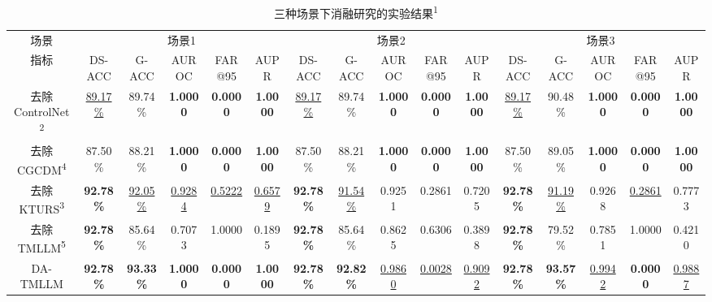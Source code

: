 \documentclass[UTF8,lettersize,journal]{IEEEtran}
\begin{document}
\setlength{\tabcolsep}{1pt}
\begin{table}[t!]
	\footnotesize
	\caption{三种场景下消融研究的实验结果\textsuperscript{1}}
	\renewcommand{\arraystretch}{1.5}
	\centering
	\label{tab:ablation_study}       %
	\begin{tabular}{c|ccccc|ccccc|ccccc}
		\toprule[1pt]\noalign{\vspace{0.5pt}}
		场景&\multicolumn{5}{c|}{场景1}&\multicolumn{5}{c|}{场景2}&\multicolumn{5}{c}{场景3}
		\\\cmidrule(lr){2-6}\cmidrule(lr){7-11}\cmidrule(lr){12-16}
		指标&DS-ACC &G-ACC &AUROC &FAR@95 &AUPR &DS-ACC &G-ACC &AUROC &FAR@95 &AUPR &DS-ACC &G-ACC &AUROC &FAR@95 &AUPR \\\midrule[1pt] 
		去除ControlNet\textsuperscript{2}
		& \underline{89.17\%} & 89.74\% & \textbf{1.0000} & \textbf{0.0000} & \textbf{1.0000} & \underline{89.17\%} & 89.74\% & \textbf{1.0000} & \textbf{0.0000} & \textbf{1.0000} & \underline{89.17\%} & 90.48\% & \textbf{1.0000} & \textbf{0.0000} & \textbf{1.0000} \\
		\noalign{\vspace{2.8pt}}\hline\noalign{\smallskip}
		去除CGCDM\textsuperscript{4}
		& 87.50\% & 88.21\% & \textbf{1.0000} & \textbf{0.0000} & \textbf{1.0000} & 87.50\% & 88.21\% & \textbf{1.0000} & \textbf{0.0000} & \textbf{1.0000} & 87.50\% & 89.05\% & \textbf{1.0000} & \textbf{0.0000} & \textbf{1.0000} \\
		\noalign{\vspace{2.8pt}}\hline\noalign{\smallskip}
		去除KTURS\textsuperscript{3}
		& \textbf{92.78\%} & \underline{92.05\%} & \underline{0.9284} & \underline{0.5222} & \underline{0.6579} & \textbf{92.78\%} & \underline{91.54\%} & 0.9251 & 0.2861 & 0.7205 & \textbf{92.78\%} & \underline{91.19\%} & 0.9268 & \underline{0.2861} & 0.7773 \\
		\noalign{\vspace{2.8pt}}\hline\noalign{\smallskip}
		去除TMLLM\textsuperscript{5}
		& \textbf{92.78\%} & 85.64\% & 0.7073 & 1.0000 & 0.1895 & \textbf{92.78\%} & 85.64\% & 0.8625 & 0.6306 & 0.3898 & \textbf{92.78\%} & 79.52\% & 0.7851 & 1.0000 & 0.4210 \\
		\noalign{\vspace{2.8pt}}\hline\noalign{\smallskip}
		DA-TMLLM
		& \textbf{92.78\%} & \textbf{93.33\%} & \textbf{1.0000} & \textbf{0.0000} & \textbf{1.0000} & \textbf{92.78\%} & \textbf{92.82\%} & \underline{0.9860} & \underline{0.0028} & \underline{0.9092} & \textbf{92.78\%} & \textbf{93.57\%} & \underline{0.9942} & \textbf{0.0000} & \underline{0.9887} \\

\end{tabular}
\end{table}
\end{document}
